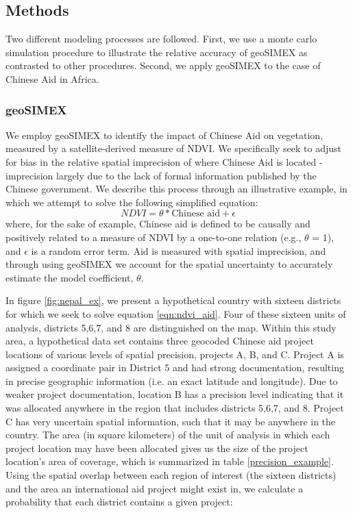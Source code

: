 \documentclass[11pt]{article}
\begin{document}
\subsection{Methods}
Two different modeling processes are followed.  First, we use a monte carlo simulation procedure to illustrate the relative accuracy of geoSIMEX as contrasted to other procedures.  Second, we apply geoSIMEX to the case of Chinese Aid in Africa.

\subsubsection{geoSIMEX}
We employ geoSIMEX to identify the impact of Chinese Aid on vegetation, measured by a satellite-derived measure of NDVI.
We specifically seek to adjust for bias in the relative spatial imprecision of where Chinese Aid is located - imprecision largely due to the lack of formal information published by the Chinese government.
We describe this process through an illustrative example, in which we attempt to solve the following simplified equation:
\begin{equation}
NDVI = \theta * \text{Chinese aid} + \epsilon
\label{eqn:ndvi_aid}
\end{equation}
where, for the sake of example, Chinese aid is defined to be causally and positively related to a measure of NDVI by a one-to-one relation (e.g., $\theta$ = 1), and $\epsilon$ is a random error term. 
Aid is measured with spatial imprecision, and through using geoSIMEX we account for the spatial uncertainty to accurately estimate the model coefficient, $\theta$. 
\par
In figure \ref{fig:nepal_ex}, we present a hypothetical country with sixteen districts for which we seek to solve equation \ref{eqn:ndvi_aid}. 
Four of these sixteen units of analysis, districts 5,6,7, and 8 are distinguished on the map. 
Within this study area, a hypothetical data set contains three geocoded Chinese aid project locations of various levels of spatial precision, projects A, B, and C. 
Project A is assigned a coordinate pair in District 5 and had strong documentation, resulting
in precise geographic information (i.e. an exact latitude and longitude). 
Due to weaker project documentation, location B has a precision level indicating that it was allocated anywhere in the region that includes districts 5,6,7, and 8. 
Project C has very uncertain spatial information, such that it may be anywhere in the country. 
The area (in square kilometers) of the unit of analysis in which each project location may have been allocated gives us the size of the project location’s area of coverage, which is summarized in table \ref{precision_example}.
Using the spatial overlap between each region of interest (the sixteen districts) and the area an international aid project might exist in, we calculate a probability that each district contains a given project:
\end{document}
